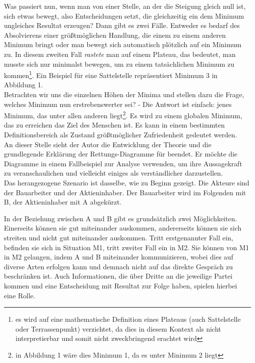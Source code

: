 \documentclass[12pt,a4paper,oneside]{article}
\begin{document}
  Was passiert nun, wenn man von einer Stelle, an der die Steigung gleich null ist, sich etwas bewegt, also Entscheidungen setzt, die gleichzeitig ein dem Minimum ungleiches Resultat erzeugen? Dann gibt es zwei Fälle. Entweder es bedarf des Absolvierens einer größtmöglichen Handlung, die einem zu einem anderen Minimum bringt oder man bewegt sich automatisch plötzlich auf ein Minimum zu. In diesem zweiten Fall \textit{rastete} man auf einem Plateau, das bedeutet, man musste sich nur minimalst bewegen, um zu einem tatsächlichen Minimum zu kommen\footnote{es wird auf eine mathematische Definition eines Plateaus (auch Sattelstelle oder Terrassenpunkt) verzichtet, da dies in diesem Kontext als nicht interpretierbar und somit nicht zweckbringend erachtet wird}. Ein Beispiel für eine Sattelstelle repräsentiert Minimum 3 in Abbildung 1. \\
  
  Betrachten wir uns die einzelnen Höhen der Minima und stellen dazu die Frage, welches Minimum nun erstrebenswerter sei? - Die Antwort ist einfach: jenes Minimum, das unter allen anderen liegt\footnote{in Abbildung 1 wäre dies Minimum 1, da es unter Minimum 2 liegt}. Es wird zu einem globalen Minimum, das zu erreichen das Ziel des Menschen ist. Es kann in einem bestimmten Definitionsbereich als Zustand größtmöglicher Zufriedenheit gedeutet werden. \\
  
  An dieser Stelle sieht der Autor die Entwicklung der Theorie und die grundlegende Erklärung der Rettungs-Diagramme für beendet. Er möchte die Diagramme in einem Fallbeispiel zur Analyse verwenden, um ihre Aussagekraft zu veranschaulichen und vielleicht einiges als verständlicher darzustellen. \\
  
   Das herangezogene Szenario ist dasselbe, wie zu Beginn gezeigt. Die Akteure sind der Bauarbeiter und der Aktieninhaber. Der Bauarbeiter wird im Folgenden mit B, der Aktieninhaber mit A abgekürzt.
   
   In der Beziehung zwischen A und B gibt es grundsätzlich zwei Möglichkeiten. Einerseits können sie gut miteinander auskommen, andererseits können sie sich streiten und nicht gut miteinander auskommen. Tritt erstgenannter Fall ein, befinden sie sich in Situation M1, tritt zweiter Fall ein in M2. Sie können von M1 in M2 gelangen, indem A und B miteinander kommunizieren, wobei dies auf diverse Arten erfolgen kann und demnach nicht auf das direkte Gespräch zu beschränken ist. Auch Informationen, die über Dritte an die jeweilige Partei kommen und eine Entscheidung mit Resultat zur Folge haben, spielen hierbei eine Rolle. 
   
\end{document}
